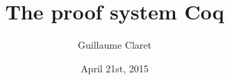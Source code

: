 \documentclass[hyperref={pdfpagelabels=false}]{beamer}
\begin{document}
\title{The proof system Coq}
\author{Guillaume Claret}
\date{April 21st, 2015}
\maketitle




\end{document}
